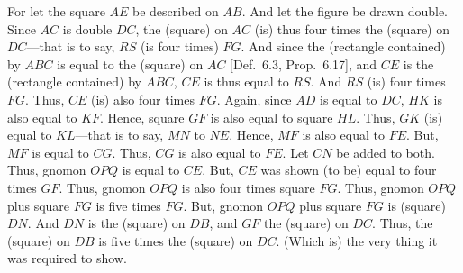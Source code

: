\begin{Parallel}{}{}
{For let the square $AE$ be described on $AB$. And let the
figure be drawn double. Since $AC$ is double $DC$, the
(square) on $AC$ (is) thus four times the (square) on $DC$---that
is to say, $RS$ (is four times) $FG$. And since the (rectangle contained)
by $ABC$ is equal to the (square) on $AC$ [Def.~6.3, Prop.~6.17],
and $CE$ is the (rectangle contained) by $ABC$,  $CE$ is thus equal
to $RS$. And $RS$ (is) four times $FG$. Thus, $CE$ (is) also four times
$FG$. Again, since $AD$ is equal to $DC$, $HK$ is also equal to
$KF$. Hence, square $GF$ is also equal to square $HL$. Thus,
$GK$ (is) equal to $KL$---that is to say, $MN$ to $NE$. 
Hence, $MF$ is also equal to $FE$. But, $MF$ is equal to $CG$.
Thus, $CG$ is also equal to $FE$. Let $CN$ be added to both.
Thus, gnomon $OPQ$ is equal to $CE$. But, $CE$ was shown (to be)
equal to four times $GF$. Thus, gnomon $OPQ$  is also four times
square $FG$. Thus, gnomon $OPQ$ plus square $FG$ is five times
$FG$. But, gnomon $OPQ$ plus square $FG$ is (square) $DN$. 
And  $DN$ is the (square) on $DB$, and $GF$ the (square)
on $DC$. Thus, the (square) on $DB$ is five times the (square)
on $DC$. (Which is) the very thing it was required to show.}
\end{Parallel}

